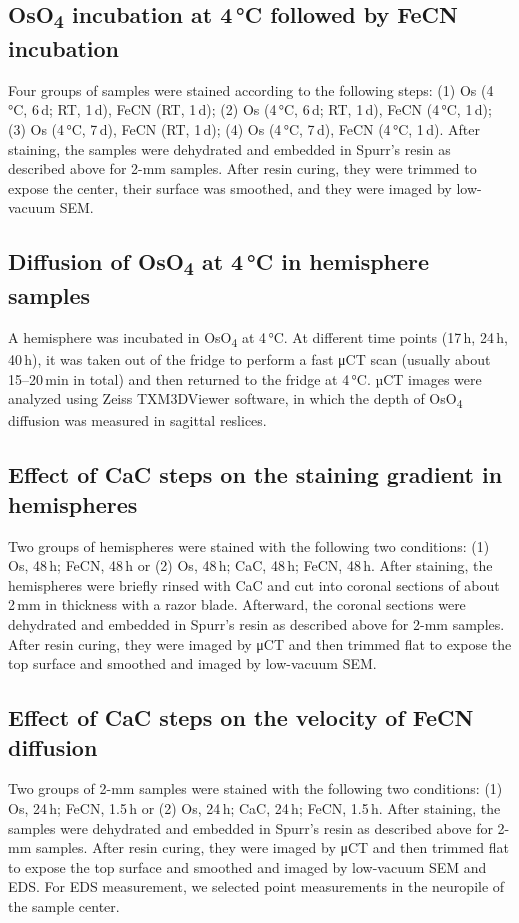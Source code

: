 \documentclass{article}
\begin{document}
\subsection*{OsO\textsubscript{4} incubation at 4\,°C followed by FeCN incubation}
Four groups of samples were stained according to the following steps: (1) Os (4\,°C, 6\,d; RT, 1\,d), FeCN (RT, 1\,d); (2) Os (4\,°C, 6\,d; RT, 1\,d), FeCN (4\,°C, 1\,d); (3) Os (4\,°C, 7\,d), FeCN (RT, 1\,d); (4) Os (4\,°C, 7\,d), FeCN (4\,°C, 1\,d). After staining, the samples were dehydrated and embedded in Spurr’s resin as described above for 2-mm samples. After resin curing, they were trimmed to expose the center, their surface was smoothed, and they were imaged by low-vacuum SEM.

\subsection*{Diffusion of OsO\textsubscript{4} at 4\,°C in hemisphere samples}
A hemisphere was incubated in OsO\textsubscript{4} at 4\,°C. At different time points (17\,h, 24\,h, 40\,h), it was taken out of the fridge to perform a fast μCT scan (usually about 15–20\,min in total) and then returned to the fridge at 4\,°C. µCT images were analyzed using Zeiss TXM3DViewer software, in which the depth of OsO\textsubscript{4} diffusion was measured in sagittal reslices.

\subsection*{Effect of CaC steps on the staining gradient in hemispheres}
Two groups of hemispheres were stained with the following two conditions: (1) Os, 48\,h; FeCN, 48\,h or (2) Os, 48\,h; CaC, 48\,h; FeCN, 48\,h. After staining, the hemispheres were briefly rinsed with CaC and cut into coronal sections of about 2\,mm in thickness with a razor blade. Afterward, the coronal sections were dehydrated and embedded in Spurr’s resin as described above for 2-mm samples. After resin curing, they were imaged by μCT and then trimmed flat to expose the top surface and smoothed and imaged by low-vacuum SEM.

\subsection*{Effect of CaC steps on the velocity of FeCN diffusion}
Two groups of 2-mm samples were stained with the following two conditions: (1) Os, 24\,h; FeCN, 1.5\,h or (2) Os, 24\,h; CaC, 24\,h; FeCN, 1.5\,h. After staining, the samples were dehydrated and embedded in Spurr’s resin as described above for 2-mm samples. After resin curing, they were imaged by μCT and then trimmed flat to expose the top surface and smoothed and imaged by low-vacuum SEM and EDS. For EDS measurement, we selected point measurements in the neuropile of the sample center.
\end{document}
